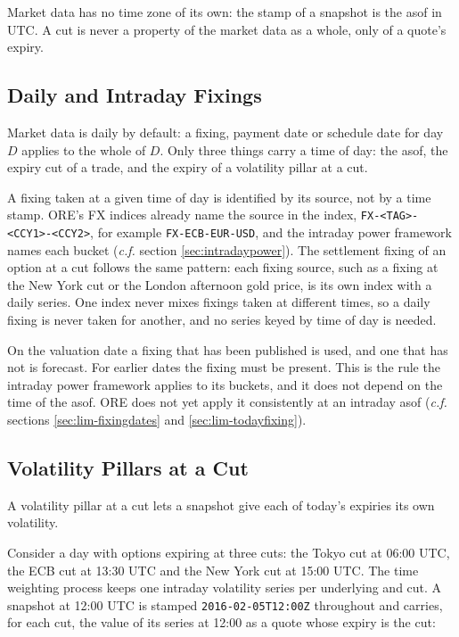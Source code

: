 \documentclass[12pt, a4paper]{article}
\begin{document}
Market data has no time zone of its own: the stamp of a snapshot is the asof in UTC. A cut is never a property of the
market data as a whole, only of a quote's expiry.

\subsection{Daily and Intraday Fixings}\label{sec:marketdata}

Market data is daily by default: a fixing, payment date or schedule date for day $D$ applies to the whole of $D$. Only
three things carry a time of day: the asof, the expiry cut of a trade, and the expiry of a volatility pillar at a cut.

A fixing taken at a given time of day is identified by its source, not by a time stamp. ORE's FX indices already name
the source in the index, \texttt{FX-<TAG>-<CCY1>-<CCY2>}, for example \texttt{FX-ECB-EUR-USD}, and the intraday power
framework names each bucket (\textit{c.f.} section \ref{sec:intradaypower}). The settlement fixing of an option at a cut follows
the same pattern: each fixing source, such as a fixing at the New York cut or the London afternoon gold price, is its
own index with a daily series. One index never mixes fixings taken at different times, so a daily fixing is never
taken for another, and no series keyed by time of day is needed.

On the valuation date a fixing that has been published is used, and one that has not is forecast. For earlier dates
the fixing must be present. This is the rule the intraday power framework applies to its buckets, and it does not
depend on the time of the asof. ORE does not yet apply it consistently at an intraday asof (\textit{c.f.} sections
\ref{sec:lim-fixingdates} and \ref{sec:lim-todayfixing}).

\subsection{Volatility Pillars at a Cut}\label{sec:volpillars}

A volatility pillar at a cut lets a snapshot give each of today's expiries its own volatility.

Consider a day with options expiring at three cuts: the Tokyo cut at 06:00 UTC, the ECB cut at 13:30 UTC and the New
York cut at 15:00 UTC. The time weighting process keeps one intraday volatility series per underlying and cut. A snapshot at
12:00 UTC is stamped \texttt{2016-02-05T12:00Z} throughout and carries, for each cut, the value of its series at
12:00 as a quote whose expiry is the cut:
\end{document}
